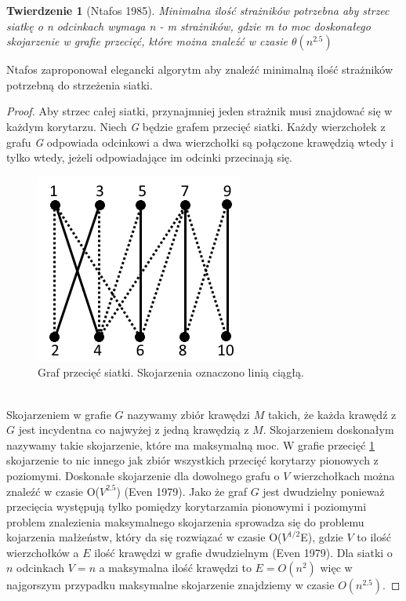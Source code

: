\documentclass[brudnopis]{xmgr}
\newtheorem{Twierdzenie}{Twierdzenie} \theoremstyle{definition}
\begin{document}
\begin{Twierdzenie}[Ntafos 1985]
	Minimalna ilość strażników potrzebna aby \textnormal{strzec siatkę} o \textnormal{n} odcinkach wymaga \textnormal{n - m} strażników, gdzie \textnormal{m} to moc doskonałego skojarzenie w grafie przecięć, które można znaleźć w czasie $\theta(n^{2.5})$
\end{Twierdzenie}
Ntafos zaproponował elegancki algorytm aby znaleźć minimalną ilość strażników potrzebną do strzeżenia siatki.
\begin{proof}
Aby strzec całej siatki, przynajmniej jeden strażnik musi znajdować się w każdym korytarzu. Niech \textit{G} będzie grafem przecięć siatki. Każdy wierzchołek z grafu \textit{G} odpowiada odcinkowi a dwa wierzchołki są połączone krawędzią wtedy i tylko wtedy, jeżeli odpowiadające im odcinki przecinają się.
 \begin{figure}[ht!]
   \centering
   \label{fig:graf przeciec}
   \includegraphics{rysunki/graf_skojarzen.png}
   \caption{Graf przecięć siatki. Skojarzenia oznaczono linią ciągłą.}
 \end{figure} 
 \\Skojarzeniem w grafie $G$ nazywamy zbiór krawędzi $M$ takich, że każda krawędź z $G$ jest incydentna co najwyżej z jedną krawędzią z $M$. Skojarzeniem doskonałym nazywamy takie skojarzenie, które ma maksymalną moc. W grafie przecięć \ref{fig:graf przeciec} skojarzenie to nic innego jak zbiór wszystkich przecięć korytarzy pionowych z poziomymi. Doskonałe skojarzenie dla dowolnego grafu o $V$ wierzchołkach można znaleźć w czasie O($V^{2.5}$) (Even 1979). Jako że graf $G$ jest dwudzielny ponieważ przecięcia występują tylko pomiędzy korytarzamia pionowymi i poziomymi problem znalezienia maksymalnego skojarzenia sprowadza się do problemu kojarzenia małżeństw, który da się rozwiązać w czasie O($V^{1/2}$E), gdzie $V$ to ilość wierzchołków a $E$ ilość krawędzi w grafie dwudzielnym (Even 1979). Dla siatki o $n$ odcinkach $V = n$ a maksymalna ilość krawędzi to $E = O(n^2)$ więc w najgorszym przypadku maksymalne skojarzenie znajdziemy w czasie $O(n^{2.5})$.

\end{proof}
\end{document}
